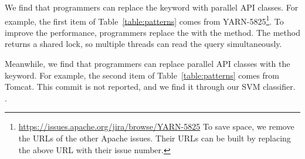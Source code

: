 
We find that programmers can replace the  keyword with parallel API classes. For example, the first item of Table~\ref{table:patterns} comes from YARN-5825\footnote{\url{https://issues.apache.org/jira/browse/YARN-5825} To save space, we remove the URLs of the other Apache issues. Their URLs can be built by replacing the above URL with their issue number.}. To improve the performance, programmers replace the  with the  method. The method returns a shared lock, so multiple threads can read the query simultaneously.



Meanwhile, we find that programmers can replace parallel API classes with the  keyword. For example, the second item of Table~\ref{table:patterns} comes from Tomcat. This commit is not reported, and we find it through our SVM classifier. .


